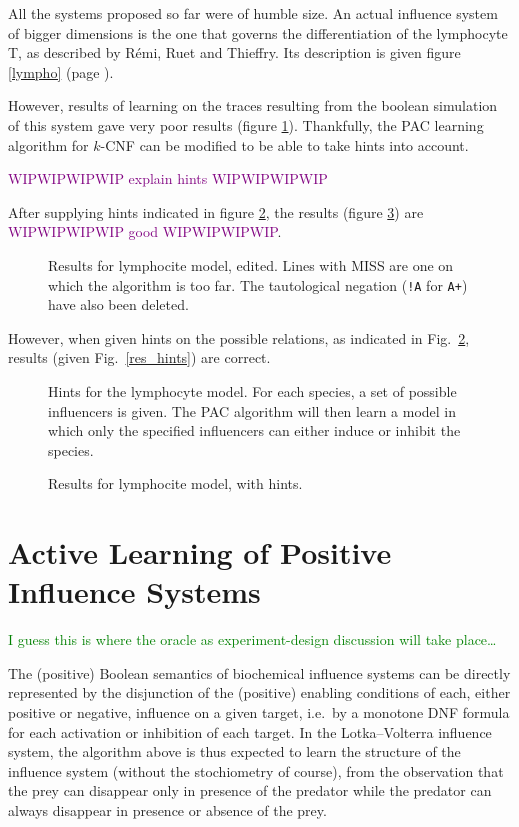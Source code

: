 \documentclass{llncs}
\newcommand{\wip}[1]{\textcolor{Purple}{WIPWIPWIPWIP #1 WIPWIPWIPWIP}}
\newcommand{\sylvain}[1]{\textcolor{green}{#1}}
\begin{document}
All the systems proposed so far were of humble size. An actual influence system of bigger dimensions is the one that governs the differentiation of the lymphocyte T, as described by R\'{e}mi, Ruet and Thieffry\cite{RRMTC06tcsb}. Its description is given figure \ref{lympho} (page \pageref{lympho}).

However, results of learning on the traces resulting from the boolean simulation of this system gave very poor results (figure \ref{lympho_res}). Thankfully, the PAC learning algorithm for $k$-CNF can be modified to be able to take hints into account.

\wip{explain hints}

After supplying hints indicated in figure \ref{hints}, the results (figure \ref{hints.res}) are \wip{good}.
	
\begin{figure}
	
	\caption{Results for lymphocite model, edited. Lines with MISS are one on which the algorithm is too far. The tautological negation (\texttt{!A} for \texttt{A+}) have also been deleted.\label{lympho_res}}
\end{figure}

However, when given hints on the possible relations, as indicated in
Fig.~\ref{hints}, results (given Fig.~\ref{res_hints}) are correct.

\begin{figure}
	
	\caption{Hints for the lymphocyte model. For each species, a set of possible influencers is given. The PAC algorithm will then learn a model in which only the specified influencers can either induce or inhibit the species.\label{hints}}
\end{figure}
\begin{figure}
	
	\caption{Results for lymphocite model, with hints.\label{hints.res}}
\end{figure}


\section{Active Learning of Positive Influence Systems}
\label{sec:oracles}

\sylvain{I guess this is where the oracle as experiment-design discussion will
take place\dots}

The (positive) Boolean semantics of biochemical influence systems
can be directly represented by the disjunction of the (positive) enabling conditions of each, either positive or negative, influence on a given target,
i.e.~by a monotone DNF formula for each activation or inhibition of each target.
In the Lotka--Volterra influence system, the algorithm above is thus expected to learn the structure of the influence system
(without the stochiometry of course),
from the observation that the prey can disappear only in presence of the predator
while the predator can always disappear in presence or absence of the prey.
\end{document}
